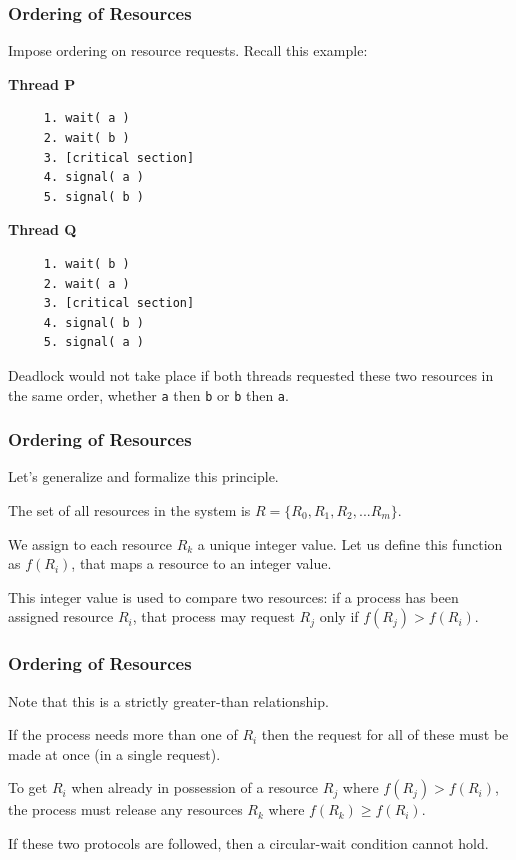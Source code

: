 \begin{frame}[fragile]
\frametitle{Ordering of Resources}

Impose ordering on resource requests. Recall this example:

\begin{multicols}{2}
\textbf{Thread P}
  \begin{verbatim}
	 1. wait( a ) 
	 2. wait( b )
	 3. [critical section]
	 4. signal( a )
	 5. signal( b )
  \end{verbatim}
\columnbreak
\textbf{Thread Q}
  \begin{verbatim}
	 1. wait( b ) 
	 2. wait( a )
	 3. [critical section]
	 4. signal( b )
	 5. signal( a )
  \end{verbatim}
\end{multicols}
\vspace{-2em}

Deadlock would not take place if both threads requested these two resources in the same order, whether \texttt{a} then \texttt{b} or \texttt{b} then \texttt{a}. 

\end{frame}

\begin{frame}
\frametitle{Ordering of Resources}

Let's generalize and formalize this principle.
 
The set of all resources in the system is $R = \{R_{0}, R_{1}, R_{2}, ... R_{m}\}$.

We assign to each resource $R_{k}$ a unique integer value. Let us define this function as $f(R_{i})$, that maps a resource to an integer value. 

This integer value is used to compare two resources: if a process has been assigned resource $R_{i}$, that process may request $R_{j}$ only if $f(R_{j}) > f(R_{i})$.


\end{frame}

\begin{frame}
\frametitle{Ordering of Resources}

Note that this is a strictly greater-than relationship. 

If the process needs more than one of $R_{i}$ then the request for all of these must be made at once (in a single request). 

To get $R_{i}$ when already in possession of a resource $R_{j}$ where $f(R_{j}) > f(R_{i})$, the process must release any resources $R_{k}$ where $f(R_{k}) \geq f(R_{i})$. 

If these two protocols are followed, then a circular-wait condition cannot hold.

\end{frame}

